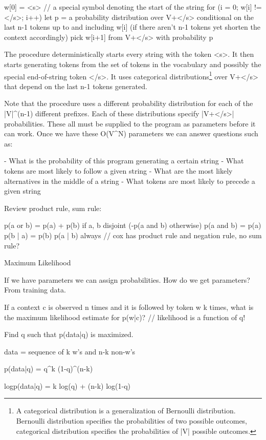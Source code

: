 w[0] = <s>  // a special symbol denoting the start of the string
for (i = 0; w[i] != </s>; i++) {
  let p = a probability distribution over V+</s> conditional on the
  last n-1 tokens up to and including w[i] (if there aren't n-1 tokens
  yet shorten the context accordingly)
  pick w[i+1] from V+</s> with probability p
}

The procedure deterministically starts every string with the token
<s>.  It then starts generating tokens from the set of tokens in the
vocabulary and possibly the special end-of-string token </s>.  It uses
categorical distributions\footnote{A categorical distribution is a
  generalization of Bernoulli distribution.  Bernoulli distribution
  specifies the probabilities of two possible outcomes, categorical
  distribution specifies the probabilities of |V| possible outcomes.}
over V+</s> that depend on the last n-1 tokens generated.

Note that the procedure uses a different probability distribution for
each of the |V|^(n-1) different prefixes.  Each of these distributions
specify |V+</s>| probabilities.  These all must be supplied to the
program as parameters before it can work.  Once we have these O(V^N)
parameters we can answer questions such as:

- What is the probability of this program generating a certain string
- What tokens are most likely to follow a given string
- What are the most likely alternatives in the middle of a string
- What tokens are most likely to precede a given string

Review product rule, sum rule:

p(a or b) = p(a) + p(b) if a, b disjoint (-p(a and b) otherwise)
p(a and b) = p(a) p(b | a) = p(b) p(a | b)  always
// cox has product rule and negation rule, no sum rule?



Maximum Likelihood

If we have parameters we can assign probabilities.  How do we get
parameters?  From training data.

If a context c is observed n times and it is followed by token w k
times, what is the maximum likelihood estimate for p(w|c)?
// likelihood is a function of q!

Find q such that p(data|q) is maximized.

data = sequence of k w's and n-k non-w's

p(data|q) = q^k (1-q)^(n-k)

logp(data|q) = k log(q) + (n-k) log(1-q)

